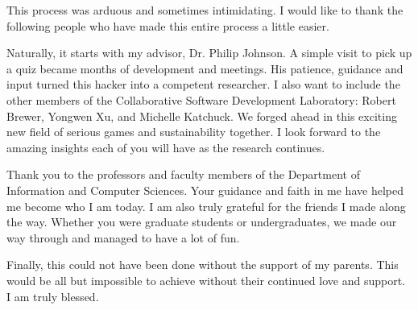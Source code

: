 
\begin{acknowledgments}
This process was arduous and sometimes intimidating. I would like to thank the following people who have made this entire process a little easier.

Naturally, it starts with my advisor, Dr. Philip Johnson. A simple visit to pick up a quiz became months of development and meetings. His patience, guidance and input turned this hacker into a competent researcher. I also want to include the other members of the Collaborative Software Development Laboratory: Robert Brewer, Yongwen Xu, and Michelle Katchuck. We forged ahead in this exciting new field of serious games and sustainability together. I look forward to the amazing insights each of you will have as the research continues.

Thank you to the professors and faculty members of the Department of Information and Computer Sciences. Your guidance and faith in me have helped me become who I am today. I am also truly grateful for the friends I made along the way. Whether you were graduate students or undergraduates, we made our way through and managed to have a lot of fun.

Finally, this could not have been done without the support of my parents. This would be all but impossible to achieve without their continued love and support. I am truly blessed.
\end{acknowledgments}